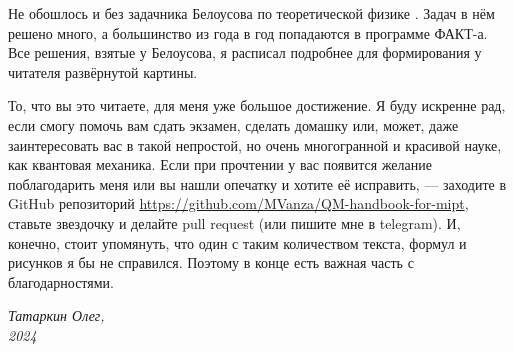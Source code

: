 Не обошлось и без задачника Белоусова по теоретической физике \cite{Белоусов}.
Задач в нём решено много, а большинство из года в год попадаются в программе
ФАКТ-а. Все решения, взятые у Белоусова, я расписал подробнее для формирования
у читателя развёрнутой картины.

То, что вы это читаете, для меня уже большое достижение. Я буду искренне рад,
если смогу помочь вам сдать экзамен, сделать домашку или, может, даже
заинтересовать вас в такой непростой, но очень многогранной и красивой науке,
как квантовая механика. Если при прочтении у вас появится желание поблагодарить
меня или вы нашли опечатку и хотите её исправить, --- заходите в GitHub
репозиторий \url{https://github.com/MVanza/QM-handbook-for-mipt}, ставьте
звездочку и делайте pull request (или пишите мне в telegram). И, конечно, стоит
упомянуть, что один с таким количеством текста, формул и рисунков я бы не
справился. Поэтому в конце есть важная часть с благодарностями. \vspace{1em}
\begin{flushright}
  \textit{Татаркин Олег,}\\ \textit{2024}
\end{flushright}
